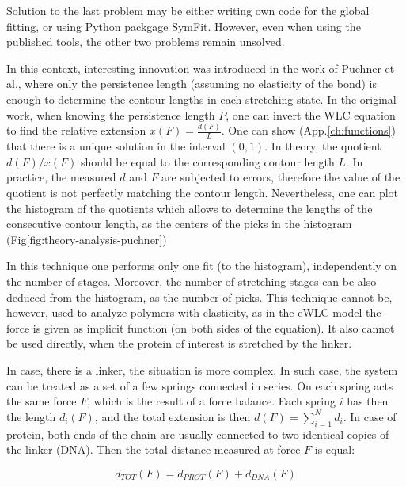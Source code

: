 Solution to the last problem may be either writing own code for the global fitting, or using Python packgage SymFit.
However, even when using the published tools, the other two problems remain unsolved.

In this context, interesting innovation was introduced in the work of Puchner et al.\cite{puchner2008comparing}, where only the persistence length (assuming no elasticity of the bond) is enough to determine the contour lengths in each stretching state.
In the original work, when knowing the persistence length $P$, one can invert the WLC equation to find the relative extension $x(F)=\frac{d(F)}{L}$.
One can show (App.\ref{ch:functions}) that there is a unique solution in the interval $(0,1)$.
In theory, the quotient $d(F)/x(F)$ should be equal to the corresponding contour length $L$.
In practice, the measured $d$ and $F$ are subjected to errors, therefore the value of the quotient is not perfectly matching the contour length.
Nevertheless, one can plot the histogram of the quotients which allows to determine the lengths of the consecutive contour length, as the centers of the picks in the histogram (Fig\ref{fig:theory-analysis-puchner})


In this technique one performs only one fit (to the histogram), independently on the number of stages.
Moreover, the number of stretching stages can be also deduced from the histogram, as the number of picks.
This technique cannot be, however, used to analyze polymers with elasticity, as in the eWLC model the force is given as implicit function (on both sides of the equation).
It also cannot be used directly, when the protein of interest is stretched by the linker.

In case, there is a linker, the situation is more complex.
In such case, the system can be treated as a set of a few springs connected in series.
On each spring acts the same force $F$, which is the result of a force balance.
Each spring $i$ has then the length $d_i(F)$, and the total extension is then $d(F) = \sum_{i=1}^{N} d_i$.
In case of protein, both ends of the chain are usually connected to two identical copies of the linker (DNA).
Then the total distance measured at force $F$ is equal:

\begin{equation}
    d_{TOT}(F) = d_{PROT}(F) + d_{DNA}(F)
    \label{eq:theory-analysis-sumd}
\end{equation}

